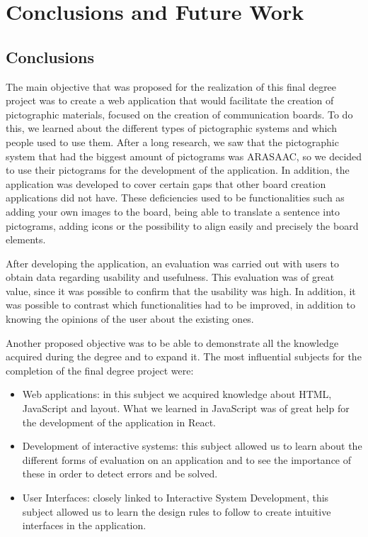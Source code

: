 \chapter{Conclusions and Future Work}
\label{cap:conclusions}

\section{Conclusions}


The main objective that was proposed for the realization of this final degree project was to create a web application that would facilitate the creation of pictographic materials, focused on the creation of communication boards. To do this, we learned about the different types of pictographic systems and which people used to use them. After a long research, we saw that the pictographic system that had the biggest amount of pictograms was ARASAAC, so we decided to use their pictograms for the development of the application. In addition, the application was developed to cover certain gaps that other board creation applications did not have. These deficiencies used to be functionalities such as adding your own images to the board, being able to translate a sentence into pictograms, adding icons or the possibility to align easily and precisely the board elements.

After developing the application, an evaluation was carried out with users to obtain data regarding usability and usefulness. This evaluation was of great value, since it was possible to confirm that the usability was high. In addition, it was possible to contrast which functionalities had to be improved, in addition to knowing the opinions of the user about the existing ones.

Another proposed objective was to be able to demonstrate all the knowledge acquired during the degree and to expand it. The most influential subjects for the completion of the final degree project were:



\begin{itemize}
	\item Web applications: in this subject we acquired knowledge about HTML, JavaScript and layout. What we learned in JavaScript was of great help for the development of the application in React. 
	\item Development of interactive systems: this subject allowed us to learn about the different forms of evaluation on an application and to see the importance of these in order to detect errors and be solved.
	\item User Interfaces: closely linked to Interactive System Development, this subject allowed us to learn the design rules to follow to create intuitive interfaces in the application.
\end{itemize}



